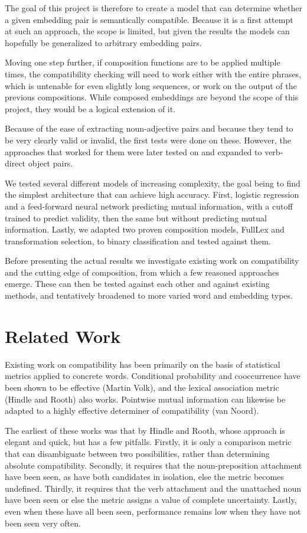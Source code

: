 \documentclass{article}
\begin{document}
The goal of this project is therefore to create a model that can determine whether a given embedding pair is semantically compatible. Because it is a first attempt at such an approach, the scope is limited, but given the results the models can hopefully be generalized to arbitrary embedding pairs.

Moving one step further, if composition functions are to be applied multiple times, the compatibility checking will need to work either with the entire phrases, which is untenable for even slightly long sequences, or work on the output of the previous compositions. While composed embeddings are beyond the scope of this project, they would be a logical extension of it.

Because of the ease of extracting noun-adjective pairs and because they tend to be very clearly valid or invalid, the first tests were done on these. However, the approaches that worked for them were later tested on and expanded to verb-direct object pairs.

We tested several different models of increasing complexity, the goal being to find the simplest architecture that can achieve high accuracy. First, logistic regression and a feed-forward neural network predicting mutual information, with a cutoff trained to predict validity, then the same but without predicting mutual information. Lastly, we adapted two proven composition models, FullLex and transformation selection, to binary classification and tested against them.

Before presenting the actual results we investigate existing work on compatibility and the cutting edge of composition, from which a few reasoned approaches emerge. These can then be tested against each other and against existing methods, and tentatively broadened to more varied word and embedding types.


\section{Related Work}

Existing work on compatibility has been primarily on the basis of statistical metrics applied to concrete words. Conditional probability and cooccurrence have been shown to be effective (Martin Volk), and the lexical association metric (Hindle and Rooth) also works. Pointwise mutual information can likewise be adapted to a highly effective determiner of compatibility (van Noord).

The earliest of these works was that by Hindle and Rooth, whose approach is elegant and quick, but has a few pitfalls. Firstly, it is only a comparison metric that can disambiguate between two possibilities, rather than determining absolute compatibility. Secondly, it requires that the noun-preposition attachment have been seen, as have both candidates in isolation, else the metric becomes undefined. Thirdly, it requires that the verb attachment and the unattached noun have been seen or else the metric assigns a value of complete uncertainty. Lastly, even when these have all been seen, performance remains low when they have not been seen very often.
\end{document}
